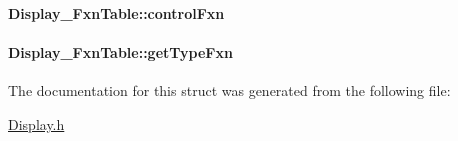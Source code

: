 \paragraph[{control\+Fxn}]{ Display\+\_\+\+Fxn\+Table\+::control\+Fxn}\label{struct_display___fxn_table_a8fc3ff1c182a8c00cbbbbe182dacba8a}
\paragraph[{get\+Type\+Fxn}]{ Display\+\_\+\+Fxn\+Table\+::get\+Type\+Fxn}\label{struct_display___fxn_table_a77c12532ad85c855dd889b28d7d5a282}


The documentation for this struct was generated from the following file\+:\begin{DoxyCompactItemize}
\item 
\hyperlink{_display_8h}{Display.\+h}\end{DoxyCompactItemize}
